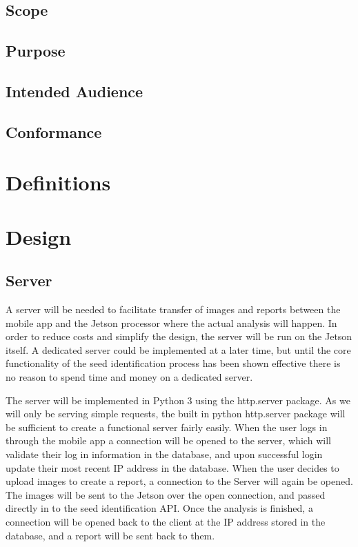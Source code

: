 \documentclass[onecolumn, draftclsnofoot,10pt, compsoc]{IEEEtran}
\begin{document}
    \subsection{Scope}
    \subsection{Purpose}
    \subsection{Intended Audience}
    \subsection{Conformance}

\section{Definitions}

\section{Design}
    \subsection{Server}
        A server will be needed to facilitate transfer of images and reports between the mobile app and the Jetson processor where the actual analysis will happen.
    In order to reduce costs and simplify the design, the server will be run on the Jetson itself.
    A dedicated server could be implemented at a later time, but until the core functionality of the seed identification process has been shown effective there is no reason to spend time and money on a dedicated server.

    The server will be implemented in Python 3 using the http.server package.
    As we will only be serving simple requests, the built in python http.server package will be sufficient to create a functional server fairly easily.
    When the user logs in through the mobile app a connection will be opened to the server, which will validate their log in information in the database, and upon successful login update their most recent IP address in the database.
    When the user decides to upload images to create a report, a connection to the Server will again be opened.
    The images will be sent to the Jetson over the open connection, and passed directly in to the seed identification API.
    Once the analysis is finished, a connection will be opened back to the client at the IP address stored in the database, and a report will be sent back to them.
\end{document}
